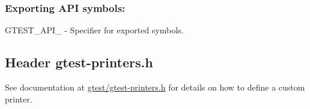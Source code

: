 \subsubsection*{Exporting A\+PI symbols\+:}


\begin{DoxyItemize}
\item {\ttfamily G\+T\+E\+S\+T\+\_\+\+A\+P\+I\+\_\+} -\/ Specifier for exported symbols.
\end{DoxyItemize}

\subsection*{Header {\ttfamily gtest-\/printers.\+h}}


\begin{DoxyItemize}
\item See documentation at {\ttfamily \hyperlink{gtest-printers_8h_source}{gtest/gtest-\/printers.\+h}} for details on how to define a custom printer. 
\end{DoxyItemize}